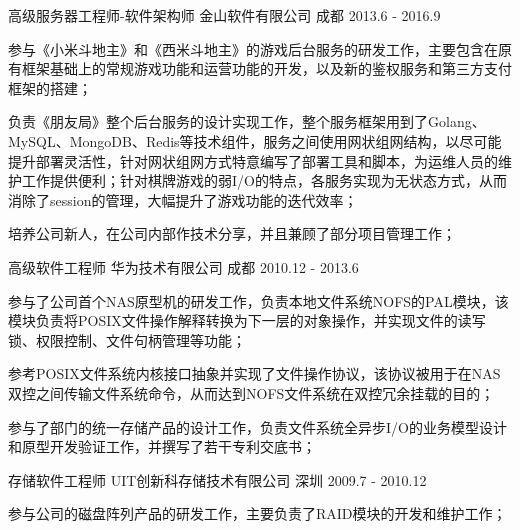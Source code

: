 \begin{cventries}
  \cventry
    {高级服务器工程师-软件架构师} %
    {金山软件有限公司} %
    {成都} %
    {2013.6 - 2016.9} %
    {
      \begin{cvitems} %
        \item {参与《小米斗地主》和《西米斗地主》的游戏后台服务的研发工作，主要包含在原有框架基础上的常规游戏功能和运营功能的开发，以及新的鉴权服务和第三方支付框架的搭建；}
        \item {负责《朋友局》整个后台服务的设计实现工作，整个服务框架用到了Golang、MySQL、MongoDB、Redis等技术组件，服务之间使用网状组网结构，以尽可能提升部署灵活性，针对网状组网方式特意编写了部署工具和脚本，为运维人员的维护工作提供便利；针对棋牌游戏的弱I/O的特点，各服务实现为无状态方式，从而消除了session的管理，大幅提升了游戏功能的迭代效率；}
        \item {培养公司新人，在公司内部作技术分享，并且兼顾了部分项目管理工作；}
      \end{cvitems}
    }

  \cventry
    {高级软件工程师} %
    {华为技术有限公司} %
    {成都} %
    {2010.12 - 2013.6} %
    {
      \begin{cvitems} %
        \item {参与了公司首个NAS原型机的研发工作，负责本地文件系统NOFS的PAL模块，该模块负责将POSIX文件操作解释转换为下一层的对象操作，并实现文件的读写锁、权限控制、文件句柄管理等功能；}
        \item {参考POSIX文件系统内核接口抽象并实现了文件操作协议，该协议被用于在NAS双控之间传输文件系统命令，从而达到NOFS文件系统在双控冗余挂载的目的；}
        \item {参与了部门的统一存储产品的设计工作，负责文件系统全异步I/O的业务模型设计和原型开发验证工作，并撰写了若干专利交底书；}
      \end{cvitems}
    }


  \cventry
    {存储软件工程师} %
    {UIT创新科存储技术有限公司} %
    {深圳} %
    {2009.7 - 2010.12} %
    {
      \begin{cvitems} %
        \item {参与公司的磁盘阵列产品的研发工作，主要负责了RAID模块的开发和维护工作；}
      \end{cvitems}
    }


\end{cventries}
